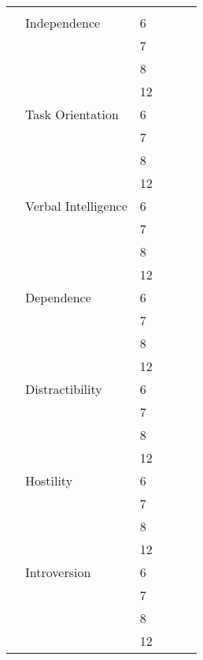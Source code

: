 \begin{center}
\begin{ThreePartTable}
\begin{longtable}{L{4cm} L{5cm} C{1cm} C{1cm} C{1.2cm} C{1.5cm}}
\checkmark	&	\checkmark	&		\\
								& Independence & 6 &
\checkmark	&	\checkmark	&		\\
									& 				& 7 &
\checkmark	&	\checkmark	&		\\
									& 				& 8 &
\checkmark	&	\checkmark	&		\\
									& 				& 12 &
\checkmark	&	\checkmark	&		\\
								& Task Orientation & 6 &
\checkmark	&	\checkmark	&		\\
									& 				& 7 &
\checkmark	&	\checkmark	&		\\
									& 				& 8 &
\checkmark	&	\checkmark	&		\\
									& 				& 12 &
\checkmark	&	\checkmark	&		\\
								& Verbal Intelligence & 6 &
\checkmark	&	\checkmark	&		\\
									& 				& 7 &
\checkmark	&	\checkmark	&		\\
									& 				& 8 &
\checkmark	&	\checkmark	&		\\
									& 				& 12 &
\checkmark	&	\checkmark	&		\\
								& Dependence & 6 &
\checkmark	&	\checkmark	&	\checkmark	\\
									& 				& 7 &
\checkmark	&	\checkmark	&	\checkmark	\\
									& 				& 8 &
\checkmark	&	\checkmark	&	\checkmark	\\
									& 				& 12 &
\checkmark	&	\checkmark	&	\checkmark	\\
								& Distractibility & 6 &
\checkmark	&	\checkmark	&	\checkmark	\\
									& 				& 7 &
\checkmark	&	\checkmark	&	\checkmark	\\
									& 				& 8 &
\checkmark	&	\checkmark	&	\checkmark	\\
									& 				& 12 &
\checkmark	&	\checkmark	&	\checkmark	\\
								& Hostility & 6 &
\checkmark	&	\checkmark	&	\checkmark	\\
									& 				& 7 &
\checkmark	&	\checkmark	&	\checkmark	\\
									& 				& 8 &
\checkmark	&	\checkmark	&	\checkmark	\\
									& 				& 12 &
\checkmark	&	\checkmark	&	\checkmark	\\
								& Introversion & 6 &
\checkmark	&	\checkmark	&	\checkmark	\\
									& 				& 7 &
\checkmark	&	\checkmark	&	\checkmark	\\
									& 				& 8 &
\checkmark	&	\checkmark	&	\checkmark	\\
									& 				& 12 &
\checkmark	&	\checkmark	&	\checkmark	\\


\end{longtable}
\end{ThreePartTable}
\end{center}
